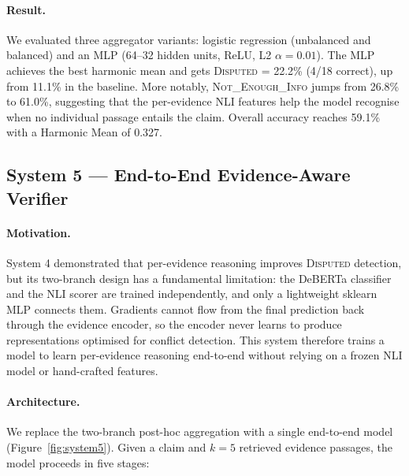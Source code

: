 \documentclass[11pt]{article}
\begin{document}
\paragraph{Result.}
We evaluated three aggregator variants: logistic regression (unbalanced
and balanced) and an MLP (64--32 hidden units, ReLU, L2 $\alpha = 0.01$).
The MLP achieves the best harmonic mean and gets
\textsc{Disputed} = 22.2\% (4/18 correct), up from 11.1\% in the
baseline.
More notably, \textsc{Not\_Enough\_Info} jumps from 26.8\% to 61.0\%,
suggesting that the per-evidence NLI features help the model recognise
when no individual passage entails the claim.
Overall accuracy reaches 59.1\% with a Harmonic Mean of 0.327.

\subsection{System 5 --- End-to-End Evidence-Aware Verifier}
\label{sec:system5}

\paragraph{Motivation.}
System 4 demonstrated that per-evidence reasoning improves
\textsc{Disputed} detection, but its two-branch design has a
fundamental limitation: the DeBERTa classifier and the NLI scorer
are trained independently, and only a lightweight sklearn MLP
connects them.
Gradients cannot flow from the final prediction back through the
evidence encoder, so the encoder never learns to produce
representations optimised for conflict detection.
This system therefore trains a model to learn per-evidence reasoning end-to-end
without relying on a frozen NLI model or hand-crafted features.

\paragraph{Architecture.}
We replace the two-branch post-hoc aggregation with a single
end-to-end model (Figure~\ref{fig:system5}).
Given a claim and $k{=}5$ retrieved evidence passages, the model
proceeds in five stages:
\end{document}
